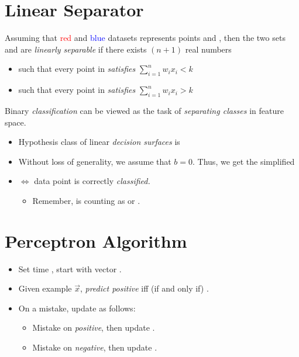 \documentclass[
	number={2},
	title={Learning Linear Separators{,} SVMs and Kernels}
]{cs584notes}
\begin{document}

\tableofcontents

\section{Linear Separator}\label{sec:linear-separator}
Assuming that \textcolor{red}{red} and \textcolor{blue}{blue} datasets represents points  and , then the two sets  and  are \emph{linearly separable} if there exists $(n+1)$ real numbers 
\begin{itemize}
	\item such that every point in  \emph{satisfies} $ \sum_{i=1}^{n} w_{i}x_{i} < k $
	\item such that every point in  \emph{satisfies} $ \sum_{i=1}^{n} w_{i}x_{i} > k $
\end{itemize}

Binary \emph{classification}  can be viewed as the task of \emph{separating classes} in feature space.
\begin{itemize}
	\item Hypothesis class of linear \emph{decision surfaces} is 
	\item Without loss of generality, we assume that $b=0$. Thus, we get the simplified 
	\item {} $\Leftrightarrow$ data point  is correctly \emph{classified.}
	\begin{itemize}
		\item Remember,  is counting as  or .
	\end{itemize}
\end{itemize}

\section{Perceptron Algorithm}\label{sec:perceptron-algorithm}
\begin{itemize}
	\item Set time , start with vector .
	\item Given example $\vec{x}$, \emph{predict positive} iff (if and only if) .
	\item On a mistake, update as follows:
	\begin{itemize}
		\item Mistake on \emph{positive}, then update .
		\item Mistake on \emph{negative}, then update .
	\end{itemize}
\end{itemize}
\end{document}

